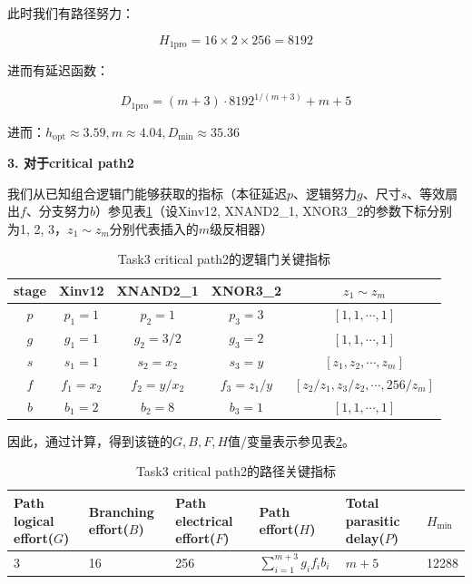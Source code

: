 \documentclass[UTF8,12pt,a4paper]{ctexart}
\begin{document}
此时我们有路径努力：

$$H_{\text{1pro}} = 16 \times 2 \times 256 = 8192$$

进而有延迟函数：

$$D_{\text{1pro}} = (m+3) \cdot 8192^{1/(m+3)} + m + 5$$

进而：$h_{\text{opt}} \approx 3.59, m \approx 4.04, D_{\text{min}} \approx 35.36$


\textbf{3. 对于critical path2}

我们从已知组合逻辑门能够获取的指标（本征延迟$p$、逻辑努力$g$、尺寸$s$、等效扇出$f$、分支努力$b$）参见表\ref{tab:task3_p2_metrics}（设Xinv12, XNAND2\_1, XNOR3\_2的参数下标分别为1, 2, 3，$z_1 \sim z_m$分别代表插入的$m$级反相器）

\begin{table}[htbp]
    \centering
    \caption{Task3 critical path2的逻辑门关键指标}
    \label{tab:task3_p2_metrics}
    \begin{tabular}{ccccc}
    \toprule
    stage & Xinv12 & XNAND2\_1 & XNOR3\_2 & $z_1 \sim z_m$ \\
    \midrule
    $p$ & $p_1 = 1$ & $p_2 = 1$ & $p_3 = 3$ & $[1,1,\cdots ,1]$ \\
    $g$ & $g_1 = 1$ & $g_2 = 3/2$ & $g_3 = 2$ & $[1,1,\cdots ,1]$ \\
    $s$ & $s_1 = 1$ & $s_2 = x_2$ & $s_3 = y$ & $[z_1, z_2, \cdots, z_m]$ \\
    $f$ & $f_1 = x_2$ & $f_2 = y/x_2$ & $f_3 = z_{1}/y$ & $[z_{2}/z_{1}, z_{3}/z_{2}, \cdots, 256/z_{m}]$ \\
    $b$ & $b_1 = 2$ & $b_2 = 8$ & $b_3 = 1$ & $[1,1,\cdots ,1]$ \\
    \bottomrule
    \end{tabular}
\end{table}

因此，通过计算，得到该链的$G,B,F,H$值/变量表示参见表\ref{tab:task3_p2_path_metrics}。

\begin{table}[htbp]
    \centering
    \caption{Task3 critical path2的路径关键指标}
    \label{tab:task3_p2_path_metrics}
    \begin{tabularx}{\linewidth}{XXXXXX}
    \toprule
    Path logical effort($G$) & Branching effort($B$) &
    Path electrical effort($F$) & Path effort($H$) &
    Total parasitic delay($P$) & $H_{\text{min}}$\\
    \midrule
    3 & 16 & 256 & $\sum_{i=1}^{m+3}{g_i f_i b_i}$ & $m+5$ & 12288\\
    \bottomrule
    \end{tabularx}
\end{table}
\end{document}
